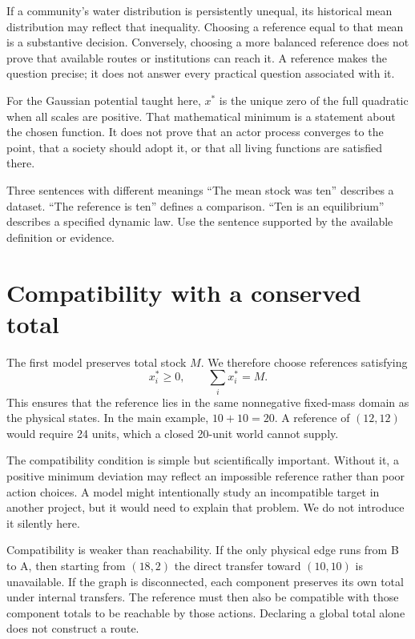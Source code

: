 If a community's water distribution is persistently unequal, its historical mean distribution may reflect that inequality. Choosing a reference equal to that mean is a substantive decision. Conversely, choosing a more balanced reference does not prove that available routes or institutions can reach it. A reference makes the question precise; it does not answer every practical question associated with it.

For the Gaussian potential taught here, \(x^*\) is the unique zero of the full quadratic when all scales are positive. That mathematical minimum is a statement about the chosen function. It does not prove that an actor process converges to the point, that a society should adopt it, or that all living functions are satisfied there.

\begin{intuitionbox}{Three sentences with different meanings}
``The mean stock was ten'' describes a dataset. ``The reference is ten'' defines a comparison. ``Ten is an equilibrium'' describes a specified dynamic law. Use the sentence supported by the available definition or evidence.
\end{intuitionbox}

\section{Compatibility with a conserved total}
The first model preserves total stock \(M\). We therefore choose references satisfying
\begin{equation}
 x_i^*\geq0,\qquad \sum_i x_i^*=M.
\end{equation}
This ensures that the reference lies in the same nonnegative fixed-mass domain as the physical states. In the main example, \(10+10=20\). A reference of \((12,12)\) would require 24 units, which a closed 20-unit world cannot supply.

The compatibility condition is simple but scientifically important. Without it, a positive minimum deviation may reflect an impossible reference rather than poor action choices. A model might intentionally study an incompatible target in another project, but it would need to explain that problem. We do not introduce it silently here.

Compatibility is weaker than reachability. If the only physical edge runs from B to A, then starting from \((18,2)\) the direct transfer toward \((10,10)\) is unavailable. If the graph is disconnected, each component preserves its own total under internal transfers. The reference must then also be compatible with those component totals to be reachable by those actions. Declaring a global total alone does not construct a route.

